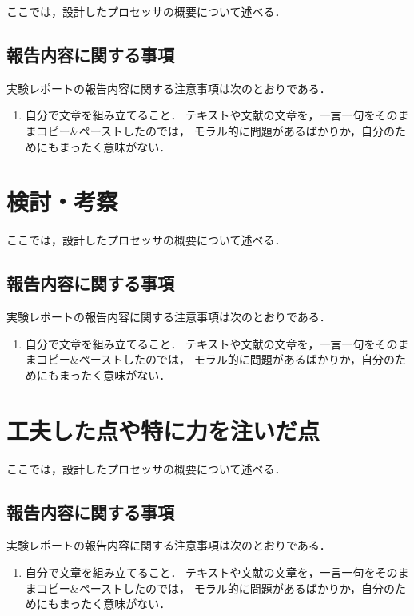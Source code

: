 \documentclass{jarticle}[11pt]
\begin{document}
ここでは，設計したプロセッサの概要について述べる．

\subsection{報告内容に関する事項}
実験レポートの報告内容に関する注意事項は次のとおりである．
\begin{enumerate}
\item 自分で文章を組み立てること．
テキストや文献の文章を，一言一句をそのままコピー\&ペーストしたのでは，
モラル的に問題があるばかりか，自分のためにもまったく意味がない．
\end{enumerate}




\section{検討・考察}
\label{sec:検討・考察}

ここでは，設計したプロセッサの概要について述べる．

\subsection{報告内容に関する事項}
実験レポートの報告内容に関する注意事項は次のとおりである．
\begin{enumerate}
\item 自分で文章を組み立てること．
テキストや文献の文章を，一言一句をそのままコピー\&ペーストしたのでは，
モラル的に問題があるばかりか，自分のためにもまったく意味がない．
\end{enumerate}




\section{工夫した点や特に力を注いだ点}
\label{sec:工夫した点や特に力を注いだ点}

ここでは，設計したプロセッサの概要について述べる．

\subsection{報告内容に関する事項}
実験レポートの報告内容に関する注意事項は次のとおりである．
\begin{enumerate}
\item 自分で文章を組み立てること．
テキストや文献の文章を，一言一句をそのままコピー\&ペーストしたのでは，
モラル的に問題があるばかりか，自分のためにもまったく意味がない．
\end{enumerate}
\end{document}
